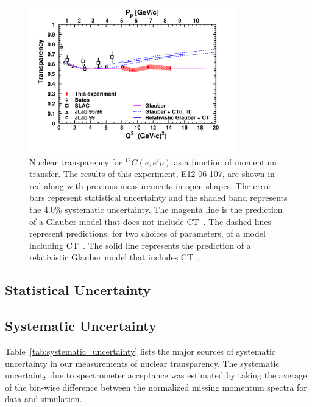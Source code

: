 \begin{figure}[!h]
    \centering
    \includegraphics[width=0.8\textwidth]{chap5/c12_results.pdf}
    \caption{
            Nuclear transparency for ${}^{12}C(e,e'p)$ as a function of
            momentum transfer.
            The results of this experiment, E12-06-107, are shown in red along
            with previous measurements in open shapes.
            The error bars represent statistical uncertainty and the
            shaded band represents the 4.0\% systematic uncertainty.
            The magenta line is the prediction of a Glauber
            model that does not include CT~\cite{Pandharipande_1992}.
            The dashed lines represent predictions, for two choices of
            parameters, of a model including CT~\cite{Frankfurt_1995_PRC}.
            The solid line represents the prediction of a relativistic Glauber
            model that includes CT~\cite{Cosyn_2006}.
            }
    \label{fig:c12_transparency_results}
\end{figure}

\subsection{Statistical Uncertainty}

\subsection{Systematic Uncertainty}

Table~\ref{tab:systematic_uncertainty} lists the major sources of systematic
uncertainty in our measurements of nuclear transparency.
The systematic uncertainty due to spectrometer acceptance was estimated by
taking the average of the bin-wise difference between the normalized missing
momentum spectra for data and simulation.

